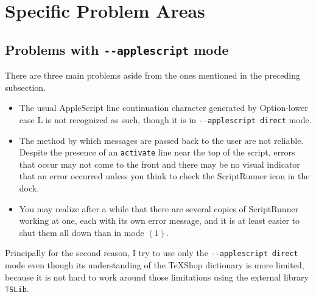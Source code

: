 \documentclass[11pt]{amsart}
\begin{document}
\section{Specific Problem Areas}
\subsection{Problems with {\tt -{}-applescript} mode}

There are three main problems aside from the ones mentioned in the preceding subsection.
\begin{itemize}
\item
The usual AppleScript line continuation character generated by Option-lower case L is not recognized as such, though it is in {\tt -{}-applescript direct} mode.
\item The method by which messages are passed back to the user are not reliable. Despite the presence of an {\tt activate} line near the top of the script, errors that occur may not come to the front and there may be no visual indicator that an error occurred unless you think to check the ScriptRunner icon in the dock.
\item You may realize after a while that there are several copies of ScriptRunner working at one, each with its own error message, and it is at least easier to shut them all down than in mode $(1)$.
\end{itemize}
Principally for the second reason, I try to use only the {\tt -{}-applescript direct} mode even though its understanding of the TeXShop dictionary is more limited, because it is not hard to work around those limitations using the external library {\tt TSLib}.
\end{document}
